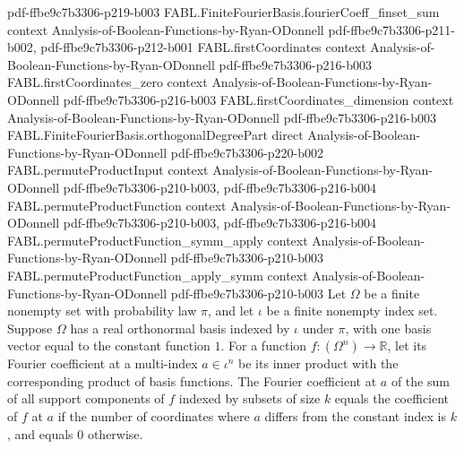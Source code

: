 \begin{theorem}
  {pdf-ffbe9c7b3306-p219-b003}
\proofstep
  {FABL.FiniteFourierBasis.fourierCoeff_finset_sum}
  {context}
  {Analysis-of-Boolean-Functions-by-Ryan-ODonnell}
  {pdf-ffbe9c7b3306-p211-b002,
    pdf-ffbe9c7b3306-p212-b001}
\proofstep
  {FABL.firstCoordinates}
  {context}
  {Analysis-of-Boolean-Functions-by-Ryan-ODonnell}
  {pdf-ffbe9c7b3306-p216-b003}
\proofstep
  {FABL.firstCoordinates_zero}
  {context}
  {Analysis-of-Boolean-Functions-by-Ryan-ODonnell}
  {pdf-ffbe9c7b3306-p216-b003}
\proofstep
  {FABL.firstCoordinates_dimension}
  {context}
  {Analysis-of-Boolean-Functions-by-Ryan-ODonnell}
  {pdf-ffbe9c7b3306-p216-b003}
\proofstep
  {FABL.FiniteFourierBasis.orthogonalDegreePart}
  {direct}
  {Analysis-of-Boolean-Functions-by-Ryan-ODonnell}
  {pdf-ffbe9c7b3306-p220-b002}
\proofstep
  {FABL.permuteProductInput}
  {context}
  {Analysis-of-Boolean-Functions-by-Ryan-ODonnell}
  {pdf-ffbe9c7b3306-p210-b003,
    pdf-ffbe9c7b3306-p216-b004}
\proofstep
  {FABL.permuteProductFunction}
  {context}
  {Analysis-of-Boolean-Functions-by-Ryan-ODonnell}
  {pdf-ffbe9c7b3306-p210-b003,
    pdf-ffbe9c7b3306-p216-b004}
\proofstep
  {FABL.permuteProductFunction_symm_apply}
  {context}
  {Analysis-of-Boolean-Functions-by-Ryan-ODonnell}
  {pdf-ffbe9c7b3306-p210-b003}
\proofstep
  {FABL.permuteProductFunction_apply_symm}
  {context}
  {Analysis-of-Boolean-Functions-by-Ryan-ODonnell}
  {pdf-ffbe9c7b3306-p210-b003}
Let $\Omega$ be a finite nonempty set with probability law $\pi$, and let $\iota$ be a
finite nonempty index set. Suppose $\Omega$ has a real orthonormal basis indexed by
$\iota$ under $\pi$, with one basis vector equal to the constant function $1$. For a
function $f:(\Omega^n)\to\mathbb R$, let its Fourier coefficient at a multi-index
$a\in\iota^n$ be its inner product with the corresponding product of basis functions.
The Fourier coefficient at $a$ of the sum of all support components of $f$ indexed by
subsets of size $k$ equals the coefficient of $f$ at $a$ if the number of coordinates
where $a$ differs from the constant index is $k$, and equals $0$ otherwise.
\end{theorem}

